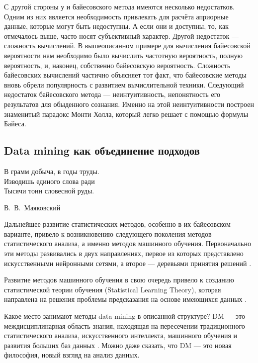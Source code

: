 С другой стороны у и байесовского метода имеются несколько недостатков. Одним из них является необходимость привлекать для расчёта априорные данные, которые могут быть недоступны. А если они и доступны, то, как отмечалось выше, часто носят субъективный характер. Другой недостаток --- сложность вычислений. В вышеописанном примере для вычисления байесовской вероятности нам необходимо было вычислить частотную вероятность, полную вероятность, и, наконец, собственно байесовскую вероятность. Сложность байесовских вычислений частично объясняет тот факт, что байесовские методы вновь обрели популярность с развитием вычислительной техники. Следующий недостаток байесовского метода --- неинтуитивность, непонятность его результатов для обыденного сознания. Именно на этой неинтуитивности построен знаменитый парадокс Монти Холла, который легко решает с помощью формулы Байеса.

\subsection{Data mining как объединение подходов}

\epigraph{В грамм добыча, в годы труды.\\
	Изводишь единого слова ради\\
	Тысячи тонн словесной руды.}{В.~В.~Маяковский}

Дальнейшее развитие статистических методов, особенно в их байесовском варианте, привело к возникновению следующего поколения методов статистического анализа, а именно методов машинного обучения. Первоначально эти методы развивались в двух направлениях, первое из которых представлено искусственными нейронными сетями, а второе --- деревьями принятия решений \cite[стр. 11-12]{handbook_stat_dm}.

Развитие методов машинного обучения в свою очередь привело к созданию статистической теории обучения (Statistical Learning Theory), которая направлена на решения проблемы предсказания на основе имеющихся данных \cite[стр. 12-13]{handbook_stat_dm}.

Какое место занимают методы data mining в описанной структуре? DM --- это междисциплинарная область знания, находящая на пересечении традиционного статистического анализа, искусственного интеллекта, машинного обучения и развития больших баз данных \cite[стр. 5]{handbook_stat_dm}. Можно даже сказать, что DM --- это новая философия, новый взгляд на анализ данных. 

